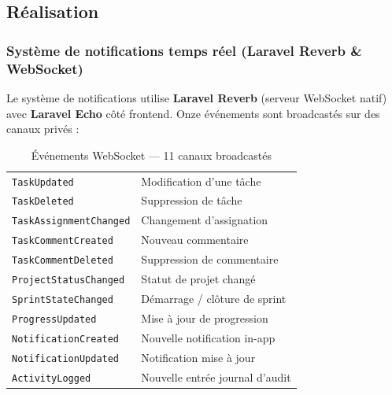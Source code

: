 \subsection{Réalisation}

\subsubsection*{Système de notifications temps réel (Laravel Reverb \& WebSocket)}

Le système de notifications utilise \textbf{Laravel Reverb} (serveur WebSocket natif)
avec \textbf{Laravel Echo} côté frontend. Onze événements sont broadcastés sur des
canaux privés :

\begin{table}[H]
  \centering
  \caption{Événements WebSocket — 11 canaux broadcastés}
  \label{tab:ws_events}
  \begin{tabularx}{\textwidth}{L{4.5cm}X}
    \toprule
     &  \\
    \midrule
    \texttt{TaskUpdated}           & Modification d'une tâche \\
    \texttt{TaskDeleted}           & Suppression de tâche \\
    \texttt{TaskAssignmentChanged} & Changement d'assignation \\
    \texttt{TaskCommentCreated}    & Nouveau commentaire \\
    \texttt{TaskCommentDeleted}    & Suppression de commentaire \\
    \texttt{ProjectStatusChanged}  & Statut de projet changé \\
    \texttt{SprintStateChanged}    & Démarrage / clôture de sprint \\
    \texttt{ProgressUpdated}       & Mise à jour de progression \\
    \texttt{NotificationCreated}   & Nouvelle notification in-app \\
    \texttt{NotificationUpdated}   & Notification mise à jour \\
    \texttt{ActivityLogged}        & Nouvelle entrée journal d'audit \\
    \bottomrule
  \end{tabularx}
\end{table}

